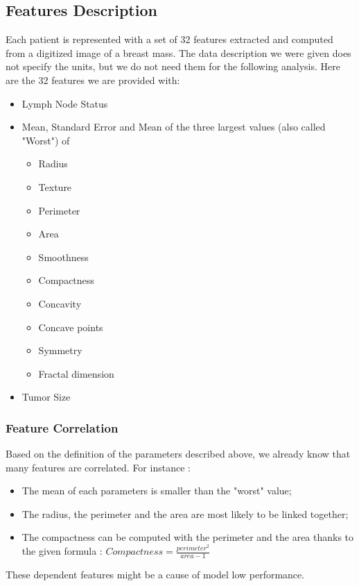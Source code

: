 \documentclass[]{report}
\begin{document}
\subsection{Features Description}
Each patient is represented with a set of 32 features extracted and computed from a digitized image of a breast mass. The data description we were given does not specify the units, but we do not need them for the following analysis. Here are the 32 features we are provided with:  
\begin{itemize}
	\item Lymph Node Status
	
	\item Mean, Standard Error and Mean of the three largest values (also called "Worst") of 
	\begin{itemize}
		\item Radius
		\item Texture
		\item Perimeter
		\item Area
		\item Smoothness
		\item Compactness
		\item Concavity
		\item Concave points
		\item Symmetry
		\item Fractal dimension
	\end{itemize}
	
	\item Tumor Size
\end{itemize}

\subsubsection{Feature Correlation}
Based on the definition of the parameters described above, we already know that many features are correlated. For instance : 
\begin{itemize}
	\item The mean of each parameters is smaller than the "worst" value;
	\item The radius, the perimeter and the area are most likely to be linked together;
	\item The compactness can be computed with the perimeter and the area thanks to the given formula : $Compactness = \frac{perimeter^2}{area - 1}$
\end{itemize}

These dependent features might be a cause of model low performance.
\end{document}
